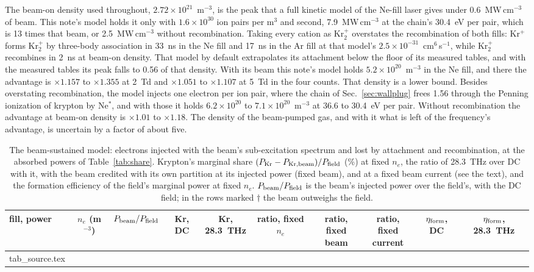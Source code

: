 \documentclass[11pt]{article}
\makeatletter
\numberwithin{equation}{section}
\newcommand{\tabinput}[1]{\@@input #1 }
\makeatother
\begin{document}
The beam-on density used throughout, $2.72\times10^{21}$~m$^{-3}$, is the peak that a
full kinetic model of the Ne-fill laser gives under 0.6~MW\,cm$^{-3}$ of beam. This note's model
holds it only with $1.6\times10^{30}$ ion pairs per m$^3$ and second, 7.9~MW\,cm$^{-3}$ at
the chain's 30.4~eV per pair, which is 13 times that beam, or 2.5~MW\,cm$^{-3}$ without
recombination. Taking every cation as Kr$_2^+$ overstates the recombination of both
fills: Kr$^+$ forms Kr$_2^+$ by three-body association in 33~ns in the Ne fill and 17~ns
in the Ar fill at that model's $2.5\times10^{-31}$~cm$^6$\,s$^{-1}$, while Kr$_2^+$
recombines in 2~ns at beam-on density. That model by default extrapolates its attachment
below the floor of its measured tables, and with the measured tables its peak falls to 0.56
of that density. With its beam this note's model holds $5.2\times10^{20}$~m$^{-3}$ in the
Ne fill, and there the advantage is $\times1.157$ to $\times1.355$ at 2~Td and
$\times1.051$ to $\times1.107$ at 5~Td in the four counts. That density is a lower bound.
Besides overstating recombination, the model injects one electron per ion pair, where
the chain of Sec.~\ref{sec:wallplug} frees 1.56 through the Penning ionization of krypton
by Ne$^*$, and with those it holds $6.2\times10^{20}$ to $7.1\times10^{20}$~m$^{-3}$ at 36.6
to 30.4~eV per pair. Without recombination the advantage at beam-on density is $\times1.01$ to
$\times1.18$. The density of the beam-pumped gas, and with it what is left of the
frequency's advantage, is uncertain by a factor of about five.

\begin{table}[h]
\centering
\caption{The beam-sustained model: electrons injected with the
beam's sub-excitation spectrum and lost by attachment and recombination, at the absorbed
powers of Table~\ref{tab:share}. Krypton's marginal share
$(P_{\rm Kr}-P_{\rm Kr,beam})/P_{\rm field}$ (\%) at fixed $n_e$, the ratio of 28.3~THz
over DC with it, with the beam credited with its own partition at its injected power
(fixed beam), and at a fixed beam current (see the text), and the formation efficiency of the
field's marginal power at fixed $n_e$.
$P_{\rm beam}/P_{\rm field}$ is the beam's injected power over the field's, with the DC
field; in the rows marked $\dagger$ the beam outweighs the field.}
\label{tab:source}
\footnotesize
\setlength{\tabcolsep}{3.5pt}
\begin{tabular}{lccccccccc}
\toprule
fill, power & $n_e$ (m$^{-3}$) & $P_{\rm beam}/P_{\rm field}$ & Kr, DC & \shortstack{Kr,\\28.3~THz} & \shortstack{ratio,\\fixed $n_e$} & \shortstack{ratio,\\fixed beam} & \shortstack{ratio, fixed\\current} & $\eta_{\rm form}$, DC & \shortstack{$\eta_{\rm form}$,\\28.3~THz}\\
\midrule
\tabinput{tab_source.tex}
\bottomrule
\end{tabular}
\end{table}
\end{document}
